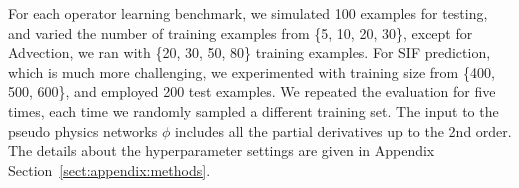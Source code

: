 For each operator learning benchmark, we simulated 100 examples for testing, and varied the number of training examples from \{5, 10, 20, 30\}, except for Advection, we ran with \{20, 30, 50, 80\} training examples. For SIF prediction,  which is much more challenging, we experimented with training size from \{400, 500, 600\}, and employed 200 test examples.
We repeated the evaluation for five times, each time we randomly sampled a different training set. The input to the pseudo physics networks $\phi$ includes all the partial derivatives up to the 2nd order. 
The details about the hyperparameter settings are given in Appendix Section~\ref{sect:appendix:methods}. 


